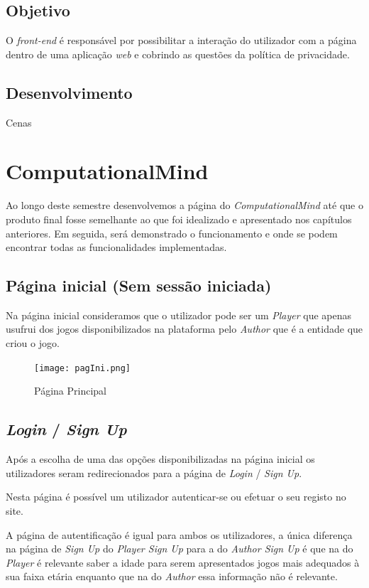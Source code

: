 \documentclass[11pt,a4paper]{report}
\begin{document}
\section{Objetivo}

O \emph{front-end} é responsável por possibilitar a interação do utilizador com a página dentro de uma aplicação \emph{web} e cobrindo as questões da política de privacidade.

\section{Desenvolvimento}

Cenas

\chapter{ComputationalMind}

Ao longo deste semestre desenvolvemos a página do \emph{ComputationalMind} até que o produto final fosse semelhante ao que foi idealizado e apresentado nos capítulos anteriores. Em seguida, será demonstrado o funcionamento e onde se podem encontrar todas as funcionalidades implementadas.

\section{Página inicial (Sem sessão iniciada)}

Na página inicial consideramos que o utilizador pode ser um \emph{Player} que apenas usufrui dos jogos disponibilizados na plataforma pelo \emph{Author} que é a entidade que criou o jogo.

\begin{figure}[h]
    \centering
    \texttt{[image: pagIni.png]}
    \caption{Página Principal}
    \label{fig:pagIni}
\end{figure}

\section{\emph{Login} / \emph{Sign Up}}
Após a escolha de uma das opções disponibilizadas na página inicial os utilizadores seram redirecionados para a página de \emph{Login} / \emph{Sign Up}. 

Nesta página é possível um utilizador autenticar-se ou efetuar o seu registo no site. 

A página de autentificação é igual para ambos os utilizadores, a única diferença na página de \emph{Sign Up} do \emph{Player Sign Up} para a do \emph{Author Sign Up} é que na do \emph{Player} é relevante saber a idade para serem apresentados jogos mais adequados à sua faixa etária enquanto que na do \emph{Author} essa informação não é relevante. 
\end{document}
